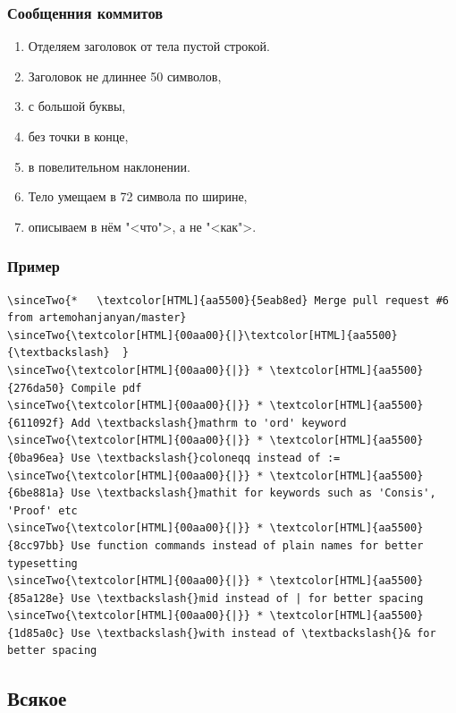 \documentclass[pdf,russian,aspectratio=169]{beamer}
\begin{document}
\begin{frame}
    \frametitle{Сообщенния коммитов}
    \pause
    \begin{enumerate}
        \item Отделяем заголовок от тела пустой строкой.
        \item Заголовок не длиннее 50 символов,
        \item с большой буквы,
        \item без точки в конце,
        \item в повелительном наклонении.
        \item Тело умещаем в 72 символа по ширине,
        \item описываем в нём "<что">, а не "<как">.
    \end{enumerate}
\end{frame}

\begin{frame}[fragile]
    \frametitle{Пример}

    \newcommand{\sinceTwo}[1]{\onslide<3->{#1}}

    \pause
    \begin{Verbatim}[commandchars=\\\{\},fontsize=\relsize{-2}]
\sinceTwo{*   \textcolor[HTML]{aa5500}{5eab8ed} Merge pull request #6 from artemohanjanyan/master}
\sinceTwo{\textcolor[HTML]{00aa00}{|}\textcolor[HTML]{aa5500}{\textbackslash}  }
\sinceTwo{\textcolor[HTML]{00aa00}{|}} * \textcolor[HTML]{aa5500}{276da50} Compile pdf
\sinceTwo{\textcolor[HTML]{00aa00}{|}} * \textcolor[HTML]{aa5500}{611092f} Add \textbackslash{}mathrm to 'ord' keyword
\sinceTwo{\textcolor[HTML]{00aa00}{|}} * \textcolor[HTML]{aa5500}{0ba96ea} Use \textbackslash{}coloneqq instead of :=
\sinceTwo{\textcolor[HTML]{00aa00}{|}} * \textcolor[HTML]{aa5500}{6be881a} Use \textbackslash{}mathit for keywords such as 'Consis', 'Proof' etc
\sinceTwo{\textcolor[HTML]{00aa00}{|}} * \textcolor[HTML]{aa5500}{8cc97bb} Use function commands instead of plain names for better typesetting
\sinceTwo{\textcolor[HTML]{00aa00}{|}} * \textcolor[HTML]{aa5500}{85a128e} Use \textbackslash{}mid instead of | for better spacing
\sinceTwo{\textcolor[HTML]{00aa00}{|}} * \textcolor[HTML]{aa5500}{1d85a0c} Use \textbackslash{}with instead of \textbackslash{}& for better spacing
    \end{Verbatim}
\end{frame}

\subsection{Всякое}
\end{document}
